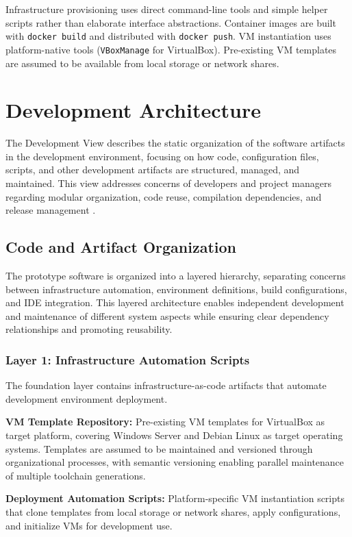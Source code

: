 Infrastructure provisioning uses direct command-line tools and simple helper scripts rather than elaborate interface abstractions.
Container images are built with \texttt{docker build} and distributed with \texttt{docker push}.
VM instantiation uses platform-native tools (\texttt{VBoxManage} for VirtualBox).
Pre-existing VM templates are assumed to be available from local storage or network shares.

\section{Development Architecture}

The Development View describes the static organization of the software artifacts in the development environment, focusing on how code, configuration files, scripts, and other development artifacts are structured, managed, and maintained.
This view addresses concerns of developers and project managers regarding modular organization, code reuse, compilation dependencies, and release management \citep{kruchten4+1ViewModel1995}.

\subsection{Code and Artifact Organization}

The prototype software is organized into a layered hierarchy, separating concerns between infrastructure automation, environment definitions, build configurations, and IDE integration.
This layered architecture enables independent development and maintenance of different system aspects while ensuring clear dependency relationships and promoting reusability.

\subsubsection{Layer 1: Infrastructure Automation Scripts}

The foundation layer contains infrastructure-as-code artifacts that automate development environment deployment.

\textbf{VM Template Repository:} Pre-existing VM templates for VirtualBox as target platform, covering Windows Server and Debian Linux as target operating systems.
Templates are assumed to be maintained and versioned through organizational processes, with semantic versioning enabling parallel maintenance of multiple toolchain generations.

\textbf{Deployment Automation Scripts:} Platform-specific VM instantiation scripts that clone templates from local storage or network shares, apply configurations, and initialize VMs for development use.

